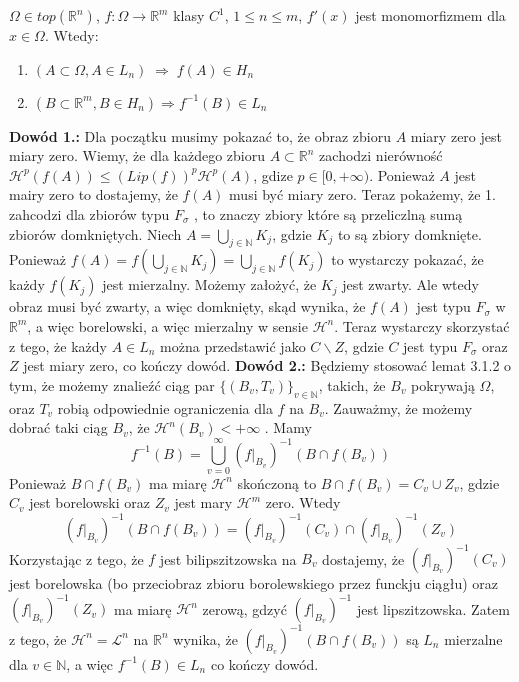 \begin{tw}
	$\Omega \in top(\mathbb{R}^n)$, $f: \Omega \rightarrow \mathbb{R}^m$ klasy $C^1$, $1 \leq n \leq m$, $f'(x)$ jest monomorfizmem dla $x \in \Omega$. Wtedy:
	\begin{enumerate}	
		\item $(A \subset \Omega, A \in L_n) \; \Longrightarrow \; f(A) \in H_n$ 
		\item $(B \subset \mathbb{R}^m, B \in H_n) \Longrightarrow f^{-1}(B) \in L_n$ 
	\end{enumerate}

	\textbf{Dowód 1.:}\newline
		Dla początku musimy pokazać to, że obraz zbioru $A$ miary zero jest miary zero. Wiemy, że dla każdego zbioru $A \subset \mathbb{R}^n$ zachodzi nierówność $\mathcal{H}^p(f(A)) \leq (Lip(f))^p \mathcal{H}^p(A)$, gdize $p \in [0, +\infty)$. Ponieważ $A$ jest mairy zero to dostajemy, że $f(A)$ musi być miary zero. 
		Teraz pokażemy, że 1. zahcodzi dla zbiorów typu $F_{\sigma}$ , to znaczy zbiory które są przeliczlną sumą zbiorów domkniętych. Niech $A = \bigcup_{j \in \mathbb{N}} K_j$, gdzie $K_j$ to są zbiory domknięte. Ponieważ $f(A) = f(\bigcup_{j \in \mathbb{N}} K_j) = \bigcup_{j \in \mathbb{N}} f(K_j)$ to wystarczy pokazać, że każdy $f(K_j)$ jest mierzalny. Możemy założyć, że $K_j$ jest zwarty. Ale wtedy obraz musi być zwarty, a więc domknięty, skąd wynika, że $f(A)$ jest typu $F_{\sigma}$ w $\mathbb{R}^m$, a więc borelowski, a więc mierzalny w sensie $\mathcal{H}^n$. 
		Teraz wystarczy skorzystać z tego, że każdy $A \in L_n$ można przedstawić jako $C \backslash Z$, gdzie $C$ jest typu $F_{\sigma}$ oraz $Z$ jest miary zero, co kończy dowód.
	\newline
	\textbf{Dowód 2.:}\newline
		Będziemy stosować lemat 3.1.2 o tym, że możemy znalieźć ciąg par $\{(B_v, T_v)\}_{v \in \mathbb{N}}$, takich, że $B_v$ pokrywają $\Omega$, oraz $T_v$ robią odpowiednie ograniczenia dla $f$ na $B_v$. Zauważmy, że możemy dobrać taki ciąg $B_v$, że $\mathcal{H}^n(B_v) < + \infty$ . Mamy $$ 
			f^{-1}(B) = \bigcup_{v=0}^{\infty} (f|_{B_v})^{-1} (B \cap f(B_v))
		$$
		Ponieważ $B \cap f(B_v)$ ma miarę $\mathcal{H}^n$ skończoną to $B \cap f(B_v) = C_v \cup Z_v$, gdzie $C_v$ jest borelowski oraz $Z_v$ jest mary $\mathcal{H}^m$ zero. Wtedy $$ 
			(f|_{B_v})^{-1}(B \cap f(B_v)) = (f|_{B_v})^{-1}(C_v) \cap (f|_{B_v})^{-1}(Z_v)
		$$
		Korzystając z tego, że $f$ jest bilipszitzowska na $B_v$ dostajemy, że $(f|_{B_v})^{-1}(C_v)$ jest borelowska (bo przeciobraz zbioru borolewskiego przez funckju ciągłu) oraz $(f|_{B_v})^{-1}(Z_v)$ ma miarę $\mathcal{H}^n$ zerową, gdzyć $(f|_{B_v})^{-1}$ jest lipszitzowska. Zatem z tego, że $\mathcal{H}^n = \mathcal{L}^n$ na $\mathbb{R}^n$ wynika, że $(f|_{B_v})^{-1}(B \cap f(B_v))$ są $L_n$ mierzalne dla $v \in \mathbb{N}$, a więc $f^{-1}(B) \in L_n$ co kończy dowód. 
\end{tw}